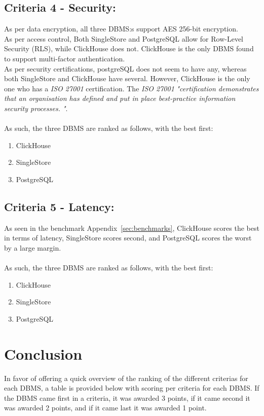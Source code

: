 \subsection{Criteria 4 - Security:}
As per data encryption, all three DBMS:s support AES 256-bit encryption.\\
As per access control, Both SingleStore and PostgreSQL allow for Row-Level Security (RLS), while ClickHouse does not.
ClickHouse is the only DBMS found to support multi-factor authentication.\\
As per security certifications, postgreSQL does not seem to have any, whereas both SingleStore and ClickHouse have several.
However, ClickHouse is the only one who has a \textit{ISO 27001} certification. The \textit{ISO 27001} \textit{"certification demonstrates that an organisation has defined and put in place best-practice information security processes. "}\cite{ISO27001}.
\\\\
As such, the three DBMS are ranked as follows, with the best first:

\begin{enumerate}
    \item ClickHouse
    \item SingleStore
    \item PostgreSQL
\end{enumerate}

\subsection{Criteria 5 - Latency:}
As seen in the benchmark Appendix~\ref{sec:benchmarks}, ClickHouse scores the best in terms of latency, SingleStore scores second, and PostgreSQL scores the worst by a large margin.
\\\\
As such, the three DBMS are ranked as follows, with the best first:

\begin{enumerate}
    \item ClickHouse
    \item SingleStore
    \item PostgreSQL
\end{enumerate}

\section{Conclusion}
In favor of offering a quick overview of the ranking of the different criterias for each DBMS, a table is provided below with scoring per criteria for each DBMS. 
If the DBMS came first in a criteria, it was awarded 3 points, if it came second it was awarded 2 points, and if it came last it was awarded 1 point.

